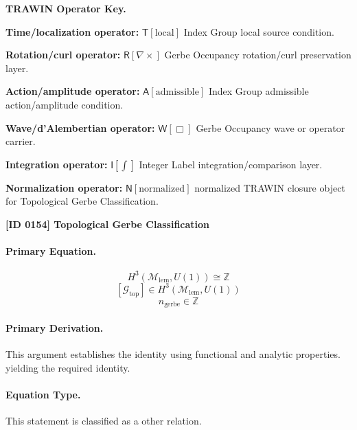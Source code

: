 \par\vspace{0.45\baselineskip}
\noindent\begin{minipage}[t]{\linewidth}
\begingroup
\small
\raggedright
\textbf{TRAWIN Operator Key.}\par
\noindent\textbf{Time/localization operator:} $\mathsf{T}\!\left[\mathrm{local}\right]$ Index Group local source condition.\par
\noindent\textbf{Rotation/curl operator:} $\mathsf{R}\!\left[\nabla\times\right]$ Gerbe Occupancy rotation/curl preservation layer.\par
\noindent\textbf{Action/amplitude operator:} $\mathsf{A}\!\left[\mathrm{admissible}\right]$ Index Group admissible action/amplitude condition.\par
\noindent\textbf{Wave/d'Alembertian operator:} $\mathsf{W}\!\left[\Box\right]$ Gerbe Occupancy wave or operator carrier.\par
\noindent\textbf{Integration operator:} $\mathsf{I}\!\left[\int\right]$ Integer Label integration/comparison layer.\par
\noindent\textbf{Normalization operator:} $\mathsf{N}\!\left[\mathrm{normalized}\right]$ normalized TRAWIN closure object for Topological Gerbe Classification.\par
\endgroup
\end{minipage}

\clearpage
\noindent\textbf{[ID 0154] Topological Gerbe Classification}\par
\vspace{0.35em}
\paragraph{Primary Equation.}
\[
H^3(\mathcal{M}_{\mathrm{lem}},U(1))\cong \mathbb{Z}
\]
\[
[\mathcal{G}_{\mathrm{top}}]\in H^3(\mathcal{M}_{\mathrm{lem}},U(1))
\]
\[
n_{\mathrm{gerbe}}\in \mathbb{Z}
\]

\paragraph{Primary Derivation.}
This argument establishes the identity using functional and analytic properties. yielding the required identity.
\paragraph{Equation Type.}
This statement is classified as a other relation.

